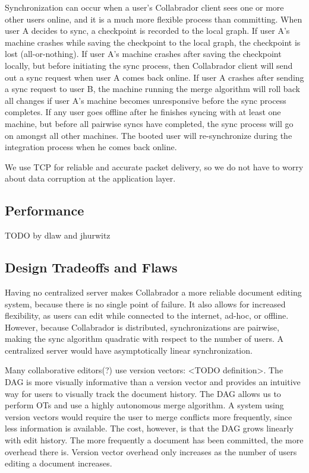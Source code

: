 \documentclass[11pt,titlepage]{article}
\begin{document}
Synchronization can occur when a user's Collabrador client sees one or
more other users online, and it is a much more flexible process than
committing.  When user A decides to sync, a checkpoint is recorded to
the local graph.  If user A's machine crashes while saving the
checkpoint to the local graph, the checkpoint is lost
(all-or-nothing). If user A's machine crashes after saving the
checkpoint locally, but before initiating the sync process, then
Collabrador client will send out a sync request when user A comes back
online.  If user A crashes after sending a sync request to user B, the
machine running the merge algorithm will roll back all changes if user
A's machine becomes unresponsive before the sync process completes. If
any user goes offline after he finishes syncing with at least one
machine, but before all pairwise syncs have completed, the sync
process will go on amongst all other machines. The booted user will
re-synchronize during the integration process when he comes back
online.

We use TCP for reliable and accurate packet delivery, so we do not
have to worry about data corruption at the application layer.

\subsection{Performance}

TODO by dlaw and jhurwitz

\subsection{Design Tradeoffs and Flaws}

Having no centralized server makes Collabrador a more reliable
document editing system, because there is no single point of
failure. It also allows for increased flexibility, as users can edit
while connected to the internet, ad-hoc, or offline. However, because
Collabrador is distributed, synchronizations are pairwise, making the
sync algorithm quadratic with respect to the number of users. A
centralized server would have asymptotically linear synchronization.

Many collaborative editors(?) use version vectors: <TODO definition>.
The DAG is more visually informative than a version vector and
provides an intuitive way for users to visually track the document
history. The DAG allows us to perform OTs and use a highly autonomous
merge algorithm.  A system using version vectors would require the
user to merge conflicts more frequently, since less information is
available. The cost, however, is that the DAG grows linearly with edit
history. The more frequently a document has been committed, the more
overhead there is. Version vector overhead only increases as the
number of users editing a document increases.
\end{document}
